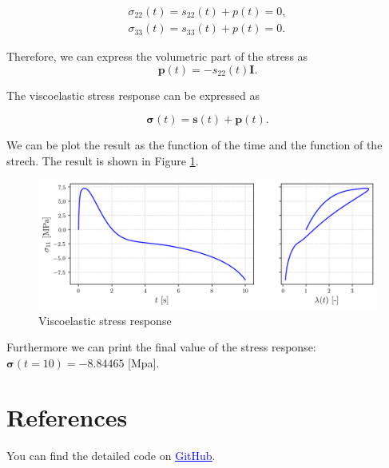 \documentclass[12pt,a4paper]{article}
\begin{document}
\begin{equation}
    \begin{matrix}
        \sigma_{22}(t) = s_{22}(t) + p(t) = 0, \\
        \sigma_{33}(t) = s_{33}(t) + p(t) = 0.
    \end{matrix}
\end{equation}

Therefore, we can express the volumetric part of the stress as
\begin{equation}
    \boldsymbol{p}(t) = - s_{22}(t)\boldsymbol{I}.
\end{equation}

The viscoelastic stress response can be expressed as

\begin{equation}
    \boldsymbol{\sigma}(t) = \boldsymbol{s}(t) + \boldsymbol{p}(t).
\end{equation}

We can be plot the result as the function of the time and the function of the strech. The result is shown in Figure \ref{fig:stress}.

\begin{figure}[H]
    \centering
    \includegraphics[scale=0.8]{figures/stress.png}
    \caption{Viscoelastic stress response}
    \label{fig:stress}
\end{figure}

Furthermore we can print the final value of the stress response: $\boldsymbol{\sigma}(t=10) = -8.84465$ [Mpa].

\newpage

\section*{References}

You can find the detailed code on \href{https://github.com/zsoca000/Finite-elastic-deformations-HW1/blob/main/solution2.ipynb}{\textcolor{blue}{\underline{GitHub}}}.
\end{document}
